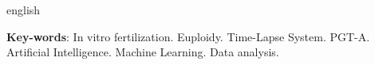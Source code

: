 \begin{resumo}[Abstract]
\begin{otherlanguage*}{english}
  \vspace{\onelineskip}
 
  \noindent 
  \textbf{Key-words}: In vitro fertilization. Euploidy. Time-Lapse System. PGT-A. Artificial Intelligence. Machine Learning. Data analysis.
 \end{otherlanguage*}
\end{resumo}
